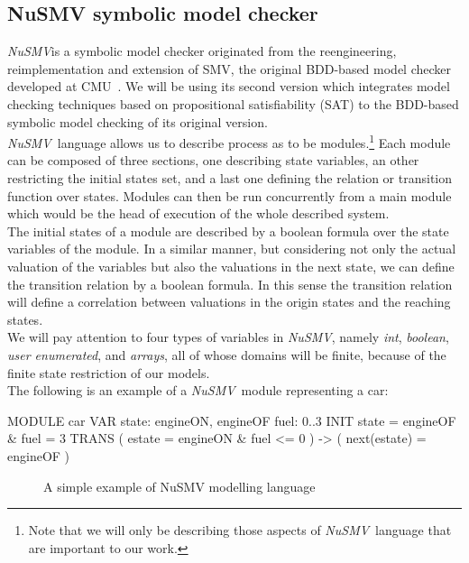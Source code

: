 \documentclass[12pt]{llncs2e/llncs}
\newcommand{\nusmv}{\mbox{\textit{NuSMV}}}
\begin{document}
\subsection{NuSMV symbolic model checker}\label{nusmv}
\nusmv is a symbolic model checker originated from the reengineering,
reimplementation and extension of SMV, the original BDD-based model checker
developed at CMU~\cite{cimatti}. We will be using its second version which
integrates model checking techniques based on propositional satisfiability
(SAT) to the BDD-based symbolic model checking of its original version.\\
\nusmv ~language allows us to describe process as to be modules.\footnote{Note
that we will only be describing those aspects of \nusmv ~language that are
important to our work.} Each module
can be composed of three sections, one describing state variables, an other
restricting the initial states set, and a last one defining the relation or
transition function over states. Modules can then be run
concurrently from a main module which would be the head of execution of the whole
described system.\\
The initial states of a module are described by a boolean formula over the
state variables of the module. In a similar manner, but considering not
only the actual valuation of the variables but also the valuations in
the next state, we can define the transition relation by a boolean formula.
In this sense the transition relation will define a correlation between
valuations in the origin states and the reaching states.\\
We will pay attention to four types of variables in \nusmv, namely \textit{int}, \textit{boolean}, \textit{user enumerated}, and \textit{arrays}, all of whose domains will be
finite, because of the finite state restriction of our models.\\
The following is an example of a \nusmv ~module representing a car:
\begin{verbbox}
MODULE car
    VAR
        state: {engineON, engineOF}
        fuel: 0..3
    INIT
        state = engineOF & fuel = 3
    TRANS
        ( estate = engineON & fuel <= 0 ) 
        -> 
        ( next(estate) = engineOF )
\end{verbbox}
\begin{figure}[h]
\begin{framed}
    \centering
    \theverbbox
\end{framed}
    \caption{A simple example of NuSMV modelling language}
    \label{nusmvexample}
\end{figure}
\end{document}
